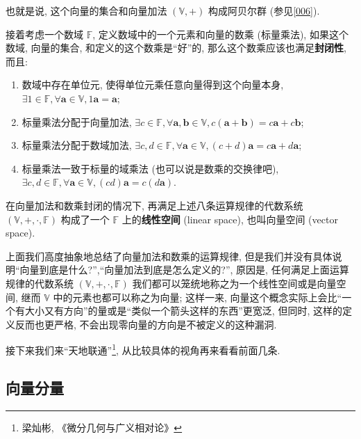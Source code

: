 \begin{newquote}
也就是说, 这个向量的集合和向量加法 $(\mathbb{V},+)$ 构成阿贝尔群
(参见\ref{006}).
\end{newquote}

接着考虑一个数域 $\mathbb{F}$, 定义数域中的一个元素和向量的数乘
(标量乘法), 如果这个数域, 向量的集合, 和定义的这个数乘是``好''的,
那么这个数乘应该也满足\textbf{封闭性}, 而且:

\begin{enumerate}
\def\labelenumi{\arabic{enumi}.}
\setcounter{enumi}{4}
\item
  数域中存在单位元, 使得单位元乘任意向量得到这个向量本身,
  $\exists 1\in\mathbb{F},\forall\boldsymbol{a}\in\mathbb{V},1\boldsymbol{a}=\boldsymbol{a}$;
\item
  标量乘法分配于向量加法,
  $\exists c\in\mathbb{F},\forall\boldsymbol{a},\boldsymbol{b}\in\mathbb{V},c(\boldsymbol{a}+\boldsymbol{b})=c\boldsymbol{a}+c\boldsymbol{b}$;
\item
  标量乘法分配于数域加法,
  $\exists c,d\in\mathbb{F},\forall\boldsymbol{a}\in\mathbb{V},(c+d)\boldsymbol{a}=c\boldsymbol{a}+d\boldsymbol{a}$;
\item
  标量乘法一致于标量的域乘法 (也可以说是数乘的交换律吧),
  $\exists c,d\in\mathbb{F},\forall\boldsymbol{a}\in\mathbb{V},(cd)\boldsymbol{a}=c(d\boldsymbol{a})$.
\end{enumerate}

\begin{newquote}
在向量加法和数乘封闭的情况下, 再满足上述八条运算规律的代数系统
$(\mathbb{V},+,\cdot,\mathbb{F})$ 构成了一个 $\mathbb{F}$
上的\textbf{线性空间} (linear space), 也叫向量空间 (vector space).
\end{newquote}

上面我们高度抽象地总结了向量加法和数乘的运算规律,
但是我们并没有具体说明``向量到底是什么?'',``向量加法到底是怎么定义的?'',
原因是, 任何满足上面运算规律的代数系统
$(\mathbb{V},+,\cdot,\mathbb{F})$
我们都可以笼统地称之为一个线性空间或是向量空间, 继而 $\mathbb{V}$
中的元素也都可以称之为向量; 这样一来,
向量这个概念实际上会比``一个有大小又有方向''的量或是``类似一个箭头这样的东西''更宽泛,
但同时, 这样的定义反而也更严格,
不会出现零向量的方向是不被定义的这种漏洞.

接下来我们来``天地联通''\footnote{梁灿彬, 《微分几何与广义相对论》},
从比较具体的视角再来看看前面几条.

\subsection{向量分量}

